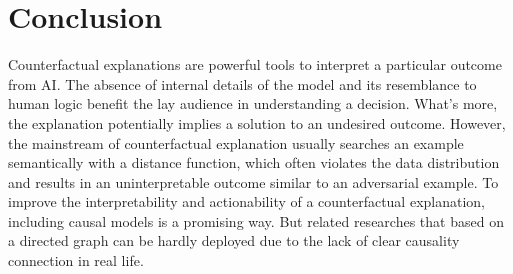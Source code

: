 \section{Conclusion}\label{sec:Conclude}
Counterfactual explanations are powerful tools to interpret a particular outcome from AI. The absence of internal details of the model and its resemblance to human logic benefit the lay audience in understanding a decision. What's more, the explanation potentially implies a solution to an undesired outcome. However, the mainstream of counterfactual explanation usually searches an example semantically with a distance function, which often violates the data distribution and results in an uninterpretable outcome similar to an adversarial example. To improve the interpretability and actionability of a counterfactual explanation, including causal models is a promising way. But related researches that based on a directed graph can be hardly deployed due to the lack of clear causality connection in real life.    